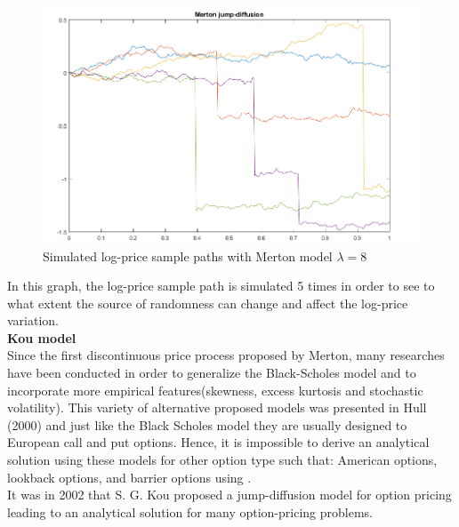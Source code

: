 \documentclass[12pt]{report}
\begin{document}
\begin{figure}[h]

\centering
\includegraphics[scale=0.7]{merton.png} 
\caption{Simulated log-price sample paths with Merton model  $\lambda=8$}
\end{figure}
In this graph, the log-price sample path is simulated 5 times in order to see to what extent the source of randomness can change and affect the log-price variation. 
\\


\large\textbf{Kou model}\\

Since the first discontinuous price process proposed by Merton, many researches have been conducted in order to generalize the Black-Scholes model and to incorporate more empirical features(skewness, excess kurtosis and stochastic volatility). This variety of alternative proposed models was presented in Hull (2000) and just like the Black Scholes model they are usually designed to European call and put options.
Hence, it is impossible to derive an analytical solution using these models for other option type such that: American options, lookback options, and barrier options using  .\\

It was in 2002 that S. G. Kou  proposed a jump-diffusion model for option pricing leading to an analytical solution for many option-pricing problems.
\end{document}
